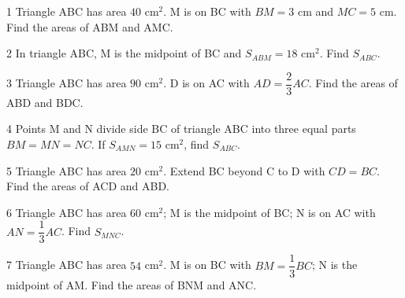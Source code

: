 \begin{probbox}{1}{\relax}
Triangle ABC has area $40$ cm$^2$. M is on BC with $BM=3$ cm and $MC=5$ cm. Find the areas of ABM and AMC.
\end{probbox}
\gap
\begin{probbox}{2}{\relax}
In triangle ABC, M is the midpoint of BC and $S_{ABM}=18$ cm$^2$. Find $S_{ABC}$.
\end{probbox}
\gap
\begin{probbox}{3}{\relax}
Triangle ABC has area $90$ cm$^2$. D is on AC with $AD=\dfrac23AC$. Find the areas of ABD and BDC.
\end{probbox}
\gap
\begin{probbox}{4}{\relax}
Points M and N divide side BC of triangle ABC into three equal parts $BM=MN=NC$. If $S_{AMN}=15$ cm$^2$, find $S_{ABC}$.
\end{probbox}
\gap
\begin{probbox}{5}{\relax}
Triangle ABC has area $20$ cm$^2$. Extend BC beyond C to D with $CD=BC$. Find the areas of ACD and ABD.
\end{probbox}
\gap
\begin{probbox}{6}{\relax}
Triangle ABC has area $60$ cm$^2$; M is the midpoint of BC; N is on AC with $AN=\dfrac13AC$. Find $S_{MNC}$.
\end{probbox}
\gap
\begin{probbox}{7}{\relax}
Triangle ABC has area $54$ cm$^2$. M is on BC with $BM=\dfrac13BC$; N is the midpoint of AM. Find the areas of BNM and ANC.
\end{probbox}

